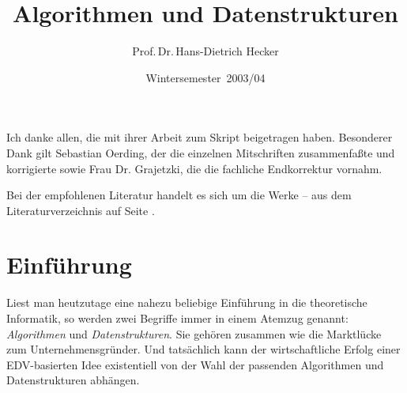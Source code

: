 \documentclass{scrreprt}%
\theoremstyle{break}
\begin{document}

\author{Prof.\,Dr.\,Hans-Dietrich Hecker}
\title{Algorithmen und Datenstrukturen}
\date{Wintersemester~2003/04}
\maketitle
%
%
%
						
\tableofcontents 
{}


Ich danke allen, die mit ihrer Arbeit zum Skript beigetragen haben. Besonderer Dank gilt Sebastian Oerding, der die einzelnen
Mitschriften zusammenfaßte und korrigierte sowie Frau Dr. Grajetzki, die die fachliche Endkorrektur vornahm.

\vspace{1eX}
Bei der empfohlenen Literatur handelt es sich um die Werke \cite{cormen}--\cite{sedgewick} aus dem Literaturverzeichnis auf Seite
\pageref{literaturverzeichnis}.

\chapter{Einführung}

Liest man heutzutage eine nahezu beliebige Einführung in die theoretische
Informatik, so werden zwei Begriffe immer in einem Atemzug genannt:
\textit{Algorithmen} und \textit{Datenstrukturen}. Sie gehören zusammen
wie die Marktlücke zum Unternehmensgründer. Und tatsächlich kann der 
wirtschaftliche Erfolg einer EDV-basierten Idee existentiell von der Wahl
der passenden Algorithmen und Datenstrukturen abhängen.
\end{document}
